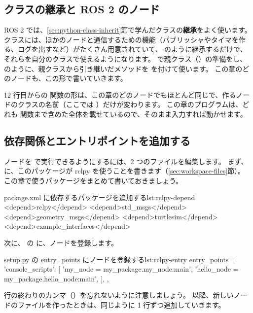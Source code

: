 \subsection{クラスの継承と ROS 2 のノード}

ROS 2 では、\ref{sec:python-class-inherit}節で学んだクラスの\textbf{継承}をよく使います。
 クラスには、ほかのノードと通信するための機能（パブリッシャやタイマを作る、ログを出すなど）がたくさん用意されていて、 のように継承するだけで、それらを自分のクラスで使えるようになります。
 で親クラス（）の準備をし、 のように、親クラスから引き継いだメソッドを  を付けて使います。
この章のどのノードも、この形で書いていきます。

12 行目からの  関数の形は、この章のどのノードでもほとんど同じで、作るノードのクラスの名前（ここでは ）だけが変わります。
この章のプログラムは、どれも  関数まで含めた全体を載せているので、そのまま入力すれば動かせます。

\subsection{依存関係とエントリポイントを追加する}

ノードを  で実行できるようにするには、2 つのファイルを編集します。
まず、 に、このパッケージが rclpy を使うことを書きます（\ref{sec:workspace-files}節）。
この章で使うパッケージをまとめて書いておきましょう。

\begin{codelisting}[style=xml]{package.xml に依存するパッケージを追加する}{lst:rclpy-depend}
  <depend>rclpy</depend>
  <depend>std_msgs</depend>
  <depend>geometry_msgs</depend>
  <depend>turtlesim</depend>
  <depend>example_interfaces</depend>
\end{codelisting}

次に、 の  に、ノードを登録します。

\begin{codelisting}[style=python]{setup.py の entry\_points にノードを登録する}{lst:rclpy-entry}
    entry_points={
        'console_scripts': [
            'my_node = my_package.my_node:main',
            'hello_node = my_package.hello_node:main',
        ],
    },
\end{codelisting}

行の終わりのカンマ（\cmd{,}）を忘れないように注意しましょう。
以降、新しいノードのファイルを作ったときは、同じように 1 行ずつ追加していきます。

